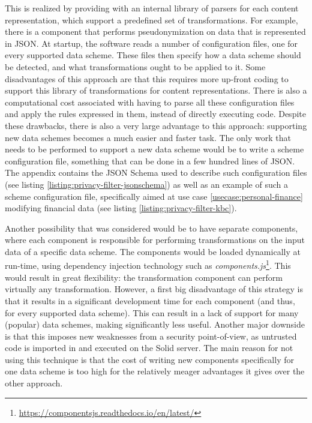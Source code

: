 This is realized by providing \middleware{} with an internal library of parsers for each content representation, which support a predefined set of transformations. For example, there is a component that performs pseudonymization on data that is represented in JSON. At startup, the software reads a number of configuration files, one for every supported data scheme. These files then specify how a data scheme should be detected, and what transformations ought to be applied to it. Some disadvantages of this approach are that this requires more up-front coding to support this library of transformations for content representations. There is also a computational cost associated with having to parse all these configuration files and apply the rules expressed in them, instead of directly executing code. Despite these drawbacks, there is also a very large advantage to this approach: supporting new data schemes becomes a much easier and faster task. The only work that needs to be performed to support a new data scheme would be to write a scheme configuration file, something that can be done in a few hundred lines of JSON. The appendix contains the JSON Schema used to describe such configuration files (see listing \ref{listing:privacy-filter-jsonschema}) as well as an example of such a scheme configuration file, specifically aimed at use case \ref{usecase:personal-finance} modifying financial data (see listing \ref{listing:privacy-filter-kbc}).

\noindent Another possibility that was considered would be to have separate components, where each component is responsible for performing transformations on the input data of a specific data scheme. The components would be loaded dynamically at run-time, using dependency injection technology such as \textit{components.js}\footnote{\url{https://componentsjs.readthedocs.io/en/latest/}}. This would result in great flexibility: the transformation component can perform virtually any transformation. However, a first big disadvantage of this strategy is that it results in a significant development time for each component (and thus, for every supported data scheme). This can result in a lack of support for many (popular) data schemes, making \middleware{} significantly less useful. Another major downside is that this imposes new weaknesses from a security point-of-view, as untrusted code is imported in and executed on the Solid server. The main reason for not using this technique is that the cost of writing new components specifically for one data scheme is too high for the relatively meager advantages it gives over the other approach. 


